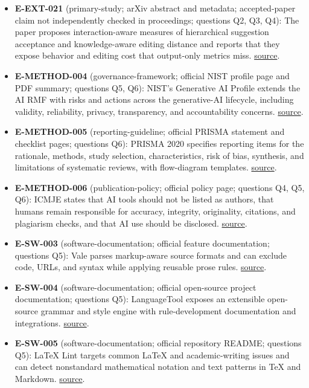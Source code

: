 \documentclass[11pt]{article}
\begin{document}
\begin{itemize}
\item
  \textbf{E-EXT-021} (primary-study; arXiv abstract and metadata; accepted-paper claim not independently checked in proceedings; questions Q2, Q3, Q4): The paper proposes interaction-aware measures of hierarchical suggestion acceptance and knowledge-aware editing distance and reports that they expose behavior and editing cost that output-only metrics miss. \href{https://arxiv.org/abs/2605.23535}{source}.
\item
  \textbf{E-METHOD-004} (governance-framework; official NIST profile page and PDF summary; questions Q5, Q6): NIST's Generative AI Profile extends the AI RMF with risks and actions across the generative-AI lifecycle, including validity, reliability, privacy, transparency, and accountability concerns. \href{https://www.nist.gov/itl/ai-risk-management-framework}{source}.
\item
  \textbf{E-METHOD-005} (reporting-guideline; official PRISMA statement and checklist pages; questions Q6): PRISMA 2020 specifies reporting items for the rationale, methods, study selection, characteristics, risk of bias, synthesis, and limitations of systematic reviews, with flow-diagram templates. \href{https://www.prisma-statement.org/prisma-2020}{source}.
\item
  \textbf{E-METHOD-006} (publication-policy; official policy page; questions Q4, Q5, Q6): ICMJE states that AI tools should not be listed as authors, that humans remain responsible for accuracy, integrity, originality, citations, and plagiarism checks, and that AI use should be disclosed. \href{https://www.icmje.org/recommendations/browse/artificial-intelligence/ai-use-by-authors.html}{source}.
\item
  \textbf{E-SW-003} (software-documentation; official feature documentation; questions Q5): Vale parses markup-aware source formats and can exclude code, URLs, and syntax while applying reusable prose rules. \href{https://vale.sh/features/markup}{source}.
\item
  \textbf{E-SW-004} (software-documentation; official open-source project documentation; questions Q5): LanguageTool exposes an extensible open-source grammar and style engine with rule-development documentation and integrations. \href{https://languagetool.org/dev}{source}.
\item
  \textbf{E-SW-005} (software-documentation; official repository README; questions Q5): LaTeX Lint targets common LaTeX and academic-writing issues and can detect nonstandard mathematical notation and text patterns in TeX and Markdown. \href{https://github.com/HirokiHamaguchi/latexlint}{source}.

\end{itemize}
\end{document}
